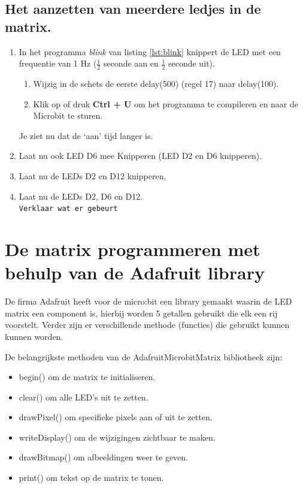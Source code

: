 \subsection{Het aanzetten van meerdere ledjes in de matrix.}\label{sect:mulLED}

\begin{enumerate}
	
\item In het programma \textit{blink} van listing \ref{lst:blink} knippert de LED met een frequentie van 1 Hz ($\frac{1}{2}$ seconde aan en $\frac{1}{2}$ seconde uit).\\
\begin{enumerate}
	\item Wijzig in de schets de eerste \textcolor{BurntOrange}{delay}(500) (regel 17) naar \textcolor{BurntOrange}{delay}(100).
	\item   Klik op  of druk \colorbox{mygray}{\textbf{Ctrl + U}} om het programma te compileren en naar de Microbit te sturen.
\end{enumerate}

Je ziet nu dat de ‘aan’ tijd langer is.
\item Laat nu ook LED D6 mee Knipperen (LED D2 en D6 knipperen).

\item Laat nu de LEDs D2 en D12 knipperen.

\item Laat nu de LEDs D2, D6 en D12.\\ 
\texttt{Verklaar wat er gebeurt}



\end{enumerate}

\section{De matrix programmeren met behulp van de Adafruit library}\label{sec:matrix}

De firma Adafruit heeft voor de micro:bit een library gemaakt waarin de LED matrix een component is, hierbij worden 5 getallen gebruikt die elk een rij voorstelt. Verder zijn er verschillende methode (functies) die gebruikt kunnen kunnen worden.

De belangrijkste methoden van de Adafruit\textunderscore Microbit\textunderscore Matrix bibliotheek zijn:
\begin{itemize}
	\item begin() om de matrix te initialiseren.
	\item clear() om alle LED's uit te zetten.
	\item drawPixel() om specifieke pixels aan of uit te zetten.
	\item writeDisplay() om de wijzigingen zichtbaar te maken.
	\item drawBitmap() om afbeeldingen weer te geven.
	\item print() om tekst op de matrix te tonen.
\end{itemize}

